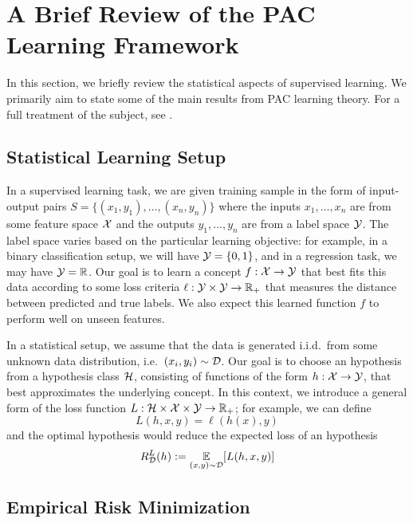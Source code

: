 \section{A Brief Review of the PAC Learning Framework}

In this section, we briefly review the statistical aspects of supervised
learning. We primarily aim to state some of the main results from PAC learning
theory. For a full treatment of the subject, see \cite{shalev2014understanding}.

\subsection{Statistical Learning Setup}

In a supervised learning task, we are given training sample in the form of
input-output pairs $S = \{(x_1, y_1), \ldots, (x_n, y_n)\}$ where the inputs
$x_1, \ldots, x_n$ are from some feature space $\mathcal{X}$ and the outputs $y_1,
\ldots, y_n$ are from a label space $\mathcal{Y}$. The label space varies based on the
particular learning objective: for example, in a binary classification setup, we
will have $\mathcal{Y} = \{0, 1\}$, and in a regression task, we may have $\mathcal{Y} = \mathbb{R}$.
Our goal is to learn a concept $f : \mathcal{X} \to \mathcal{Y}$ that best fits this data
according to some loss criteria $\ell : \mathcal{Y} \times \mathcal{Y} \to \mathbb{R}_+$ that measures
the distance between predicted and true labels. We also expect this learned
function $f$ to perform well on unseen features.

In a statistical setup, we assume that the data is generated i.i.d.\ from some
unknown data distribution, i.e.\ $(x_i, y_i) \sim \mathcal{D}$. Our goal is to choose an
hypothesis from a hypothesis class $\mathcal{H}$, consisting of functions of the form $h
: \mathcal{X} \to \mathcal{Y}$, that best approximates the underlying concept. In this context,
we introduce a general form of the loss function $L : \mathcal{H} \times \mathcal{X} \times \mathcal{Y}
\to \mathbb{R}_+$; for example, we can define
\begin{equation}
  L(h, x, y) = \ell(h(x), y)
\end{equation}
and the optimal hypothesis would reduce the expected loss of an hypothesis
\begin{equation}
  \label{eq:true-risk}
  R_{\mathcal{D}}^L(h) := \operatorname*{\mathbb{E}}_{(x, y) \sim \mathcal{D}}[L(h, x, y)]
\end{equation}

\subsection{Empirical Risk Minimization}

